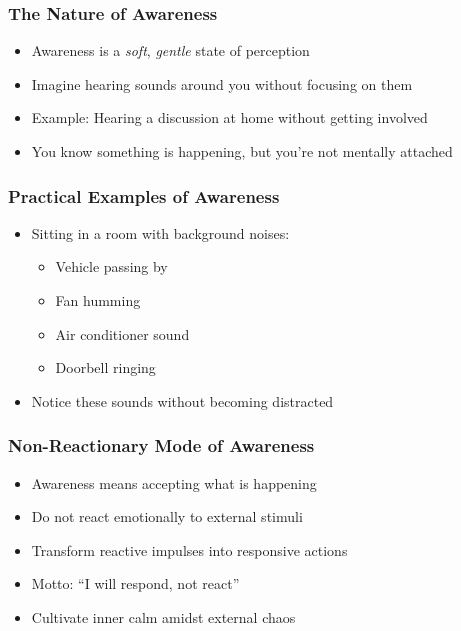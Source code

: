 \begin{frame}[fragile]\frametitle{The Nature of Awareness}
    \begin{itemize}
        \item Awareness is a \textit{soft}, \textit{gentle} state of perception
        \item Imagine hearing sounds around you without focusing on them
        \item Example: Hearing a discussion at home without getting involved
        \item You know something is happening, but you're not mentally attached
    \end{itemize}
\end{frame}

\begin{frame}[fragile]\frametitle{Practical Examples of Awareness}
    \begin{itemize}
        \item Sitting in a room with background noises:
            \begin{itemize}
                \item Vehicle passing by
                \item Fan humming
                \item Air conditioner sound
                \item Doorbell ringing
            \end{itemize}
        \item Notice these sounds without becoming distracted
    \end{itemize}
\end{frame}

\begin{frame}[fragile]\frametitle{Non-Reactionary Mode of Awareness}
    \begin{itemize}
        \item Awareness means accepting what is happening
        \item Do not react emotionally to external stimuli
        \item Transform reactive impulses into responsive actions
        \item Motto: ``I will respond, not react''
        \item Cultivate inner calm amidst external chaos
    \end{itemize}
\end{frame}

